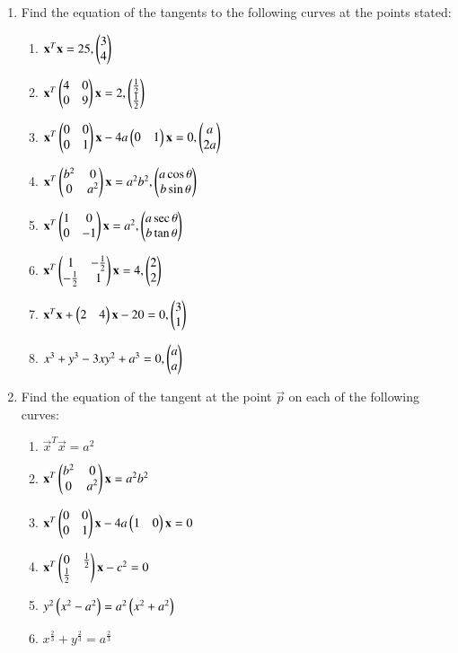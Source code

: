 \renewcommand{\theequation}{\theenumi}
\begin{enumerate}[label=\arabic*.,ref=\thesubsection.\theenumi]
\item Find the equation of the tangents to the following curves at the points stated:
\begin{enumerate}
\item
$
\mathbf{x}^T\mathbf{x} = 25, \begin{pmatrix}3\\4\end{pmatrix}
$
\item
$
\mathbf{x}^T\begin{pmatrix}4 & 0 \\ 0 & 9\end{pmatrix}\mathbf{x} = 2,
 \begin{pmatrix}\frac{1}{2} \\ \frac{1}{2}\end{pmatrix}
$
\item
$
\mathbf{x}^T\begin{pmatrix}0 & 0 \\ 0 & 1\end{pmatrix}\mathbf{x}-4a\begin{pmatrix}0 & 1\end{pmatrix}\mathbf{x}=0, \begin{pmatrix}a\\2a\end{pmatrix}
$
\item
$
\mathbf{x}^T\begin{pmatrix}b^2 & 0\\0 & a^2\end{pmatrix}\mathbf{x}=a^2b^2,
 \begin{pmatrix}a\cos\theta\\b\sin\theta\end{pmatrix}
$
\item
$
\mathbf{x}^T\begin{pmatrix}1 & 0\\0& -1\end{pmatrix}\mathbf{x} = a^2,
 \begin{pmatrix}a\sec\theta\\b\tan\theta\end{pmatrix}
$
\item
$
\mathbf{x}^T\begin{pmatrix}1 & -\frac{1}{2}\\-\frac{1}{2} & 1\end{pmatrix}\mathbf{x}=4,
 \begin{pmatrix}2\\2\end{pmatrix}
$
\item
$
\mathbf{x}^T\mathbf{x}+\begin{pmatrix}2 & 4\end{pmatrix}\mathbf{x}-20=0, \begin{pmatrix}3\\1\end{pmatrix}
$
\item
$
x^3+y^3-3xy^2+a^3 = 0,
 \begin{pmatrix}a\\a\end{pmatrix}
$
\end{enumerate}
\item Find the equation of the tangent at the point $\vec{p}$ on each
of the following curves:
\begin{enumerate}
\item
$
\vec{x}^T\vec{x} = a^2
$
\item
$
\mathbf{x}^T\begin{pmatrix}b^2 & 0\\0 & a^2\end{pmatrix}\mathbf{x}= a^2b^2
$
\item
$
\mathbf{x}^T\begin{pmatrix}0 & 0\\0 & 1\end{pmatrix}\mathbf{x}-4a\begin{pmatrix}1 & 0\end{pmatrix}\mathbf{x} = 0
$
\item
$
\mathbf{x}^T\begin{pmatrix}0 & \frac{1}{2}\\\frac{1}{2}\end{pmatrix}\mathbf{x}-c^2=0
$
\item
$
y^2\left(x^2-a^2\right)=a^2\left(x^2+a^2\right)
$
\item
$
x^{\frac{2}{3}}+y^{\frac{2}{3}}=a^{\frac{2}{3}}
$
\end{enumerate}
\end{enumerate}
